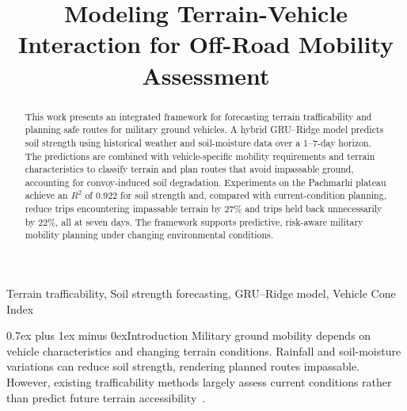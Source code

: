 \documentclass[conference]{IEEEtran}
\makeatletter
\def\section{\needspace{7\baselineskip}\@startsection{section}{1}{\z@}{2.5ex plus 1ex minus 0.5ex}%
{0.7ex plus 1ex minus 0ex}{\normalfont\normalsize\centering\scshape}}
\makeatother
\begin{document}
\title{Modeling Terrain-Vehicle Interaction for Off-Road Mobility Assessment}


\maketitle

\begin{abstract}
This work presents an integrated framework for forecasting terrain trafficability and planning safe routes for military ground vehicles. A hybrid GRU–Ridge model predicts soil strength using historical weather and soil-moisture data over a 1–7-day horizon. The predictions are combined with vehicle-specific mobility requirements and terrain characteristics to classify terrain and plan routes that avoid impassable ground, accounting for convoy-induced soil degradation. Experiments on the Pachmarhi plateau achieve an \(R^2\) of 0.922 for soil strength and, compared with current-condition planning, reduce trips encountering impassable terrain by 27\% and trips held back unnecessarily by 22\%, all at seven days. The framework supports predictive, risk-aware military mobility planning under changing environmental conditions.
\end{abstract}

\begin{IEEEkeywords}
Terrain trafficability, Soil strength forecasting, GRU–Ridge model, Vehicle Cone Index
\end{IEEEkeywords}

\section{Introduction}
Military ground mobility depends on vehicle characteristics and changing terrain conditions. Rainfall and soil-moisture variations can reduce soil strength, rendering planned routes impassable. However, existing trafficability methods largely assess current conditions rather than predict future terrain accessibility~\cite{khan2021,liu2025}.
\end{document}
